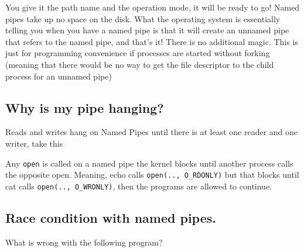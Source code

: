 You give it the path name and the operation mode, it will be ready to
go! Named pipes take up no space on the disk. What the operating system
is essentially telling you when you have a named pipe is that it will
create an unnamed pipe that refers to the named pipe, and that's it!
There is no additional magic. This is just for programming convenience
if processes are started without forking (meaning that there would be no
way to get the file descriptor to the child process for an unnamed pipe)

\subsection{Why is my pipe hanging?}\label{why-is-my-pipe-hanging}

Reads and writes hang on Named Pipes until there is at least one reader
and one writer, take this

\begin{Shaded}
\begin{Highlighting}[]
\KeywordTok{>} 
\end{Highlighting}
\end{Shaded}

Any \texttt{open} is called on a named pipe the kernel blocks until
another process calls the opposite open. Meaning, echo calls
\texttt{open(..,\ O\_RDONLY)} but that blocks until cat calls
\texttt{open(..,\ O\_WRONLY)}, then the programs are allowed to
continue.

\subsection{Race condition with named
pipes.}\label{race-condition-with-named-pipes.}

What is wrong with the following program?

\begin{Shaded}
\end{Shaded}

